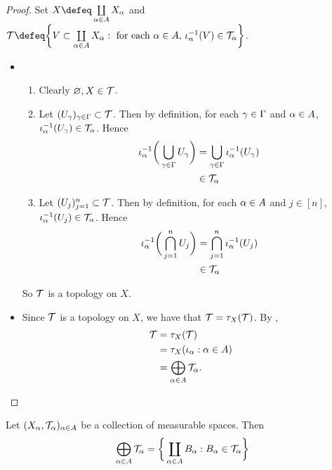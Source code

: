 \documentclass{book}
\begin{document}
	\begin{proof}
			Set $X \defeq \coprod\limits_{\al \in A}  X_{\al}$ and $\MT \defeq \bigg \{V \subset \coprod\limits_{\al \in A}  X_{\al}: \text{ for each $\al \in A$, $\iota_{\al}^{-1}(V) \in \MT_{\al}$} \bigg\}$. 
		\begin{itemize}
			\item 
			\begin{enumerate}
				\item Clearly $\varnothing, X \in \mathcal{T}$.
				\item Let $(U_{\gamma})_{\gamma \in \Gamma} \subset \mathcal{T}$. Then by definition, for each $\gamma \in \Gamma$ and $\alpha \in A$, $\iota_{\alpha}^{-1}(U_{\gamma}) \in \mathcal{T}_{\alpha}$. Hence
				\begin{align*}
					\iota_{\alpha}^{-1} \bigg( \bigcup_{\gamma \in \Gamma} U_{\gamma} \bigg)
					& = \bigcup_{\gamma \in \Gamma} \iota_{\alpha}^{-1}(U_{\gamma}) \\
					& \in \mathcal{T}_{\alpha}
				\end{align*}
				\item Let $(U_j)_{j=1}^n \subset \mathcal{T}$. Then by definition, for each $\alpha \in A$ and $j \in [n]$, $\iota_{\alpha}^{-1}(U_j) \in \mathcal{T}_{\alpha}$. Hence 
				\begin{align*}
					\iota_{\alpha}^{-1}\bigg( \bigcap_{j=1}^n U_j \bigg)
					& = \bigcap_{j=1}^n \iota_{\alpha}^{-1}(U_j)\\
					& \in \mathcal{T}_{\alpha}
				\end{align*}
			\end{enumerate}
			So $\mathcal{T}$ is a topology on $X$.
			\item Since $\mathcal{T}$ is a topology on $X$, we have that $\mathcal{T} = \tau_X(\mathcal{T})$. By , 
			\begin{align*}
				\mathcal{T}
				& = \tau_X(\mathcal{T}) \\
				& = \tau_X(\iota_{\alpha}: \alpha \in A) \\
				& = \bigoplus\limits_{\alpha \in A} \mathcal{T}_{\alpha}.
			\end{align*}
		\end{itemize}
	\end{proof}

	\begin{ex} 
		Let $(X_{\alpha}, \mathcal{T}_{\alpha})_{\alpha \in A}$ be a collection of measurable spaces. Then 
		$$\bigoplus\limits_{\alpha \in A} \mathcal{T}_{\alpha} = \bigg \{\coprod_{\alpha \in A} B_{\alpha}: B_{\alpha} \in \mathcal{T}_{\alpha} \bigg\} $$
	\end{ex}
	
\end{document}
